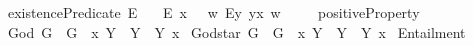 \begin{isabellebody}
\ existencePredicate{\isacharcolon}{\isacharcolon}{\isachardoublequoteopen}{\isasymup}{\isasymlangle}{\isasymzero}{\isasymrangle}{\isachardoublequoteclose}\ {\isacharparenleft}{\isachardoublequoteopen}E{\isacharbang}{\isachardoublequoteclose}{\isacharparenright}\ \isanewline
\ \ {\isachardoublequoteopen}E{\isacharbang}\ x\ \ {\isasymequiv}\ {\isacharparenleft}{\isasymlambda}w{\isachardot}\ {\isacharparenleft}\isactrlbold {\isasymexists}\isactrlsup Ey{\isachardot}\ y\isactrlbold {\isasymapprox}x{\isacharparenright}\ w{\isacharparenright}{\isachardoublequoteclose}\ \isanewline
\ \ \isanewline
{}\isamarkupfalse%
\ positiveProperty{\isacharcolon}{\isacharcolon}{\isachardoublequoteopen}{\isasymup}{\isasymlangle}{\isasymlangle}{\isasymzero}{\isasymrangle}{\isasymrangle}{\isachardoublequoteclose}\ {\isacharparenleft}{\isachardoublequoteopen}{\isasymP}{\isachardoublequoteclose}{\isacharparenright}\isanewline
{}\isamarkupfalse%
\ God{\isacharcolon}{\isacharcolon}{\isachardoublequoteopen}{\isasymup}{\isasymlangle}{\isasymzero}{\isasymrangle}{\isachardoublequoteclose}\ {\isacharparenleft}{\isachardoublequoteopen}G{\isachardoublequoteclose}{\isacharparenright}\ \ {\isachardoublequoteopen}G\ {\isasymequiv}\ {\isacharparenleft}{\isasymlambda}x{\isachardot}\ \isactrlbold {\isasymforall}Y{\isachardot}\ {\isasymP}\ Y\ \isactrlbold {\isasymrightarrow}\ {\isasymlparr}Y\ x{\isasymrparr}{\isacharparenright}{\isachardoublequoteclose}\isanewline
{}\isamarkupfalse%
\ God{\isacharunderscore}star{\isacharcolon}{\isacharcolon}{\isachardoublequoteopen}{\isasymup}{\isasymlangle}{\isasymzero}{\isasymrangle}{\isachardoublequoteclose}\ {\isacharparenleft}{\isachardoublequoteopen}G{\isacharasterisk}{\isachardoublequoteclose}{\isacharparenright}\ \ {\isachardoublequoteopen}G{\isacharasterisk}\ {\isasymequiv}\ {\isacharparenleft}{\isasymlambda}x{\isachardot}\ \isactrlbold {\isasymforall}Y{\isachardot}\ {\isasymP}\ Y\ \isactrlbold {\isasymleftrightarrow}\ {\isasymlparr}Y\ x{\isasymrparr}{\isacharparenright}{\isachardoublequoteclose}\isanewline
\isanewline
{}\isamarkupfalse%
\ Entailment{\isacharcolon}{\isacharcolon}{\isachardoublequoteopen}{\isasymup}{\isasymlangle}{\isasymlangle}{\isasymzero}{\isasymrangle}{\isacharcomma}{\isasymlangle}{\isasymzero}{\isasymrangle}{\isasymrangle}{\isachardoublequoteclose}\ {\isacharparenleft}\ {\isachardoublequoteopen}{\isasymRrightarrow}{\isachardoublequoteclose}\ {}{}{\isacharparenright}\ \isanewline

\end{isabellebody}
